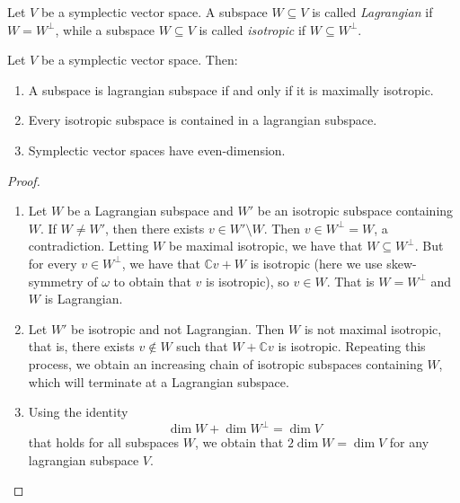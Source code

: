 \documentclass{report}
\begin{document}
\begin{definition}
    Let $V$ be a symplectic vector space.
    A subspace $W \subseteq V$ is called \emph{Lagrangian} if $W = W^\perp$, while a subspace $W \subseteq V$ is called \emph{isotropic} if $W \subseteq W^\perp$.
\end{definition}
\begin{proposition}
    Let $V$ be a symplectic vector space. Then:
    \begin{enumerate}[label=(\roman*)]
        \item A subspace is lagrangian subspace if and only if it is maximally isotropic.
        \item Every isotropic subspace is contained in a lagrangian subspace.
        \item Symplectic vector spaces have even-dimension. 
    \end{enumerate}
\end{proposition}
\begin{proof}
    \begin{enumerate}
        \item Let $W$ be a Lagrangian subspace and $W'$  be an isotropic subspace containing $W$.
        If $W \neq W'$, then there exists $v \in W' \setminus W$.
        Then $v \in W^\perp = W$, a contradiction.
        Letting $W$ be maximal isotropic, we have that $W \subseteq W^\perp$.
        But for every $v \in W^\perp$, we have that $\mathbb Cv + W$ is isotropic (here we use skew-symmetry of $\omega$ to obtain that $v$ is isotropic), so $v \in W$.
        That is $W = W^\perp$ and $W$ is Lagrangian.
        \item Let $W'$ be isotropic and not Lagrangian.
        Then $W$ is not maximal isotropic, that is, there exists $v \not \in W$ such that $W + \mathbb C v$ is isotropic.
        Repeating this process, we obtain an increasing chain of isotropic subspaces containing $W$, which will terminate at a Lagrangian subspace. 
        \item Using the identity
        \[
        \dim W + \dim W^\perp = \dim V
        \]
        that holds for all subspaces $W$, we obtain that $2 \dim W = \dim V$ for any lagrangian subspace $V$.
    \end{enumerate}
\end{proof}
\end{document}
